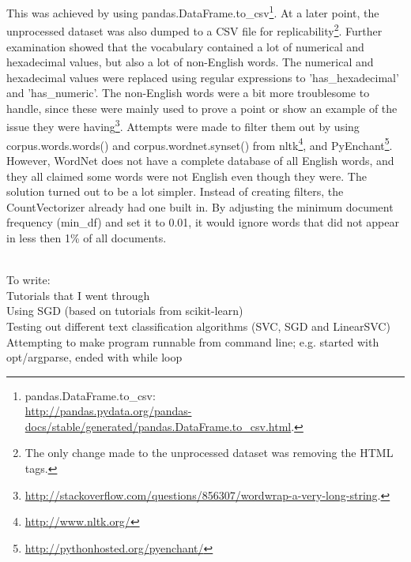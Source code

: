 This was achieved by using pandas.DataFrame.to\_csv\footnote{
	pandas.DataFrame.to\_csv: \\
	\url{http://pandas.pydata.org/pandas-docs/stable/generated/pandas.DataFrame.to_csv.html}.
	}. 
At a later point, the unprocessed dataset was also dumped to a CSV file for replicability\footnote{The only change made to the unprocessed dataset was removing the HTML tags.}.
\vspace{0.5em}\newline
Further examination showed that the vocabulary contained a lot of numerical and hexadecimal values, but also a lot of non-English words. 
The numerical and hexadecimal values were replaced using regular expressions to 'has\_hexadecimal' and 'has\_numeric'. 
The non-English words were a bit more troublesome to handle, since these were mainly used to prove a point or show an example of the issue they were having\footnote{ 
	\url{http://stackoverflow.com/questions/856307/wordwrap-a-very-long-string}.
	}. 
Attempts were made to filter them out by using corpus.words.words() and corpus.wordnet.synset() 
from \gls{nltk}\footnote{\url{http://www.nltk.org/}}, and PyEnchant\footnote{\url{http://pythonhosted.org/pyenchant/}}. 
However, WordNet does not have a complete database of all English words, and they all claimed some words were not English even though they were.
\vspace{0.5em}\newline
The solution turned out to be a lot simpler. 
Instead of creating filters, the CountVectorizer already had one built in. 
By adjusting the minimum document frequency (min\_df) and set it to 0.01, it would ignore words that did not appear in less then 1\% of all documents.

~\\
To write: \\
Tutorials that I went through \\
Using SGD (based on tutorials from scikit-learn) \\
Testing out different text classification algorithms (SVC, SGD and LinearSVC) \\
Attempting to make program runnable from command line; e.g. started with opt/argparse, ended with while loop

